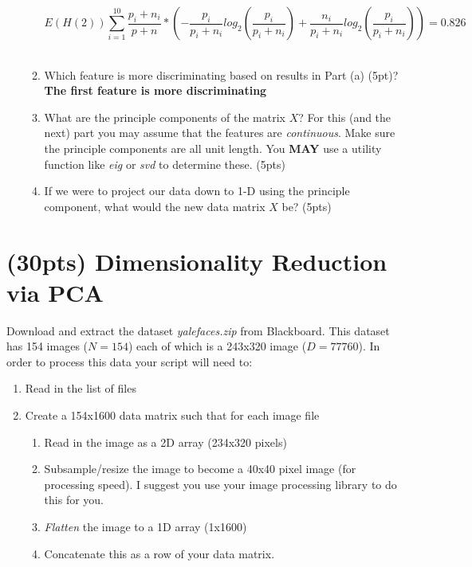\documentclass[12pt]{article}
\begin{document}
\begin{enumerate}
\begin{enumerate}
	$$	E(H(2)) \sum_{i=1}^{10} \frac{p_{i}+n_{i}}{p + n} * \left (-\frac{p_{i}}{p_{i}+n_{i}}log_{2} \left(\frac{p_{i}}{p_{i}+n_{i}}\right) + \frac{n_{i}}{p_{i}+n_{i}}log_{2}\left(\frac{p_{i}}{p_{i}+n_{i}}\right)\right) = 0.826 $$ \\
	\item Which feature is more discriminating based on results in Part (a) (5pt)?\\
	\textbf{The first feature is more discriminating}
	\item What are the principle components of the matrix $X$?  For this (and the next) part you may assume that the features are \emph{continuous}.  Make sure the principle components  are all unit length.   You \textbf{MAY} use a utility function like \emph{eig} or \emph{svd} to determine these. (5pts)
	\item If we were to project our data down to 1-D using the principle component, what would the new data matrix $X$ be? (5pts)
	\end{enumerate}

\end{enumerate}


\newpage
\section{(30pts) Dimensionality Reduction via PCA}\label{pca}
Download and extract the dataset \emph{yalefaces.zip} from Blackboard.  This dataset has 154 images ($N=154$) each of which is a 243x320 image ($D=77760$).  In order to process this data your script will need to:

\begin{enumerate}
\item Read in the list of files
\item Create a 154x1600 data matrix such that for each image file
	\begin{enumerate}
	\item Read in the image as a 2D array (234x320 pixels)
	\item Subsample/resize the image to become a 40x40 pixel image (for processing speed).  I suggest you use your image processing library to do this for you.
	\item \emph{Flatten} the image to a 1D array (1x1600)
	\item Concatenate this as a row of your data matrix.
	\end{enumerate}
\end{enumerate}
\end{document}
